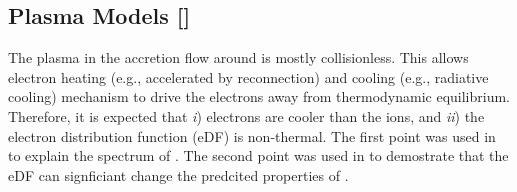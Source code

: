 \documentclass[twocolumn,tighten,dvipsnames]{aastex63}
\newcommand\ckc[1]{{\color{MidnightBlue}[ckc: #1]}}
\begin{document}



\subsection{Plasma Models
  []}
\label{sec:eDF}

The plasma in the accretion flow around \sgra is mostly collisionless.
This allows electron heating (e.g., accelerated by reconnection) and
cooling (e.g., radiative cooling) mechanism to drive the electrons
away from thermodynamic equilibrium.
Therefore, it is expected that \emph{i}) electrons are cooler than the
ions, and \emph{ii}) the electron distribution function (eDF) is
non-thermal.
The first point was used in \citet{1998ApJ...492..554N} to explain the
spectrum of \sgra.
The second point was used in \citep{2000ApJ...541..234O} to demostrate
that the eDF can signficiant change the predcited properties of \sgra.
\end{document}
